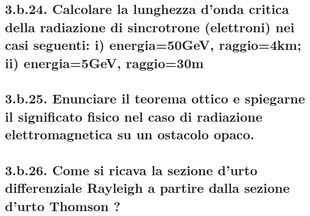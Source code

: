 \subsection*{3.b.24. Calcolare la lunghezza d’onda critica della radiazione di sincrotrone (elettroni) nei casi seguenti: i) energia=50GeV, raggio=4km; ii) energia=5GeV, raggio=30m}

\subsection*{3.b.25. Enunciare il teorema ottico e spiegarne il significato fisico nel caso di radiazione elettromagnetica su un ostacolo opaco.}

\subsection*{3.b.26. Come si ricava la sezione d'urto differenziale Rayleigh a partire dalla sezione d'urto Thomson ?}
